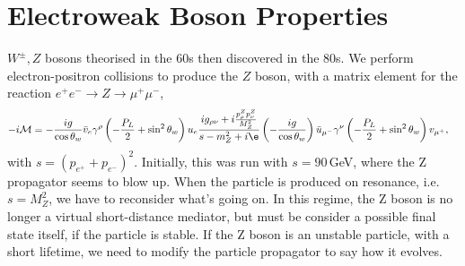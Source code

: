 \documentclass[a4paper, 11pt, normalem]{report}
\begin{document}
\chapter{Electroweak Boson Properties}
$W^\pm,Z$ bosons theorised in the 60s then discovered in the 80s.
We perform electron-positron collisions to produce the $Z$ boson, with a matrix element for the reaction $e^+e^-\to Z\to\mu^+\mu^-$,
\begin{align}
    -i\mathcal{M} &= -\frac{ig}{\cos\theta_w}\bar{v}_e\gamma^\rho\left(-\frac{P_L}{2}+\sin^2\theta_w\right)u_e\frac{ig_{\rho\nu}+i\frac{p_\rho^Zp_\nu^Z}{M_Z^2}}{s-m_Z^2+i\e}\left(-\frac{ig}{\cos\theta_w}\right)\bar{u}_{\mu^-}\gamma^\nu\left(-\frac{P_L}{2}+\sin^2\theta_w\right)v_{\mu^+},
\end{align}
with $s=(p_{e^+}+p_{e^-})^2$.
Initially, this was run with $s=90\,$GeV, where the Z propagator seems to blow up.
When the particle is produced on resonance, i.e. $s=M_Z^2$, we have to reconsider what's going on.
In this regime, the Z boson is no longer a virtual short-distance mediator, but must be consider a possible final state itself, if the particle is stable.
If the Z boson is an unstable particle, with a short lifetime, we need to modify the particle propagator to say how it evolves.
\end{document}
